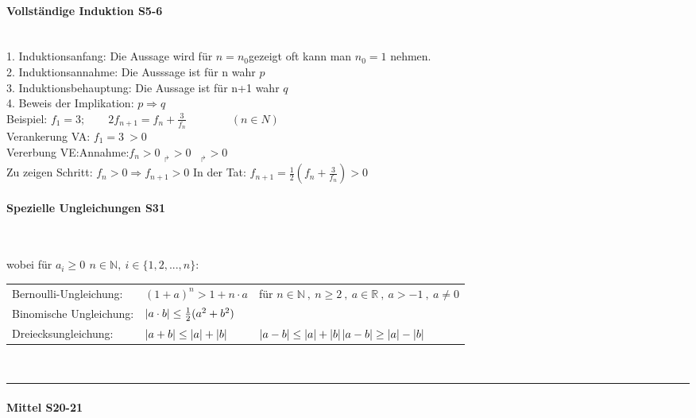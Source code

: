 \paragraph{Vollständige Induktion \color{red} S5-6}\
\color{black}
\label{sub:allgemeines}
\\
1. Induktionsanfang: 		Die Aussage wird für $n = n_{0}$gezeigt oft kann man $n_{0}=1$ nehmen.\\
2. Induktionsannahme: 		Die Ausssage ist für n wahr $p$\\
3. Induktionsbehauptung:	Die Aussage ist für n+1 wahr $q$\\
4. Beweis der Implikation: $p \Rightarrow q$\\
Beispiel: $f_{1}=3;\qquad 2f_{n+1}=f_{n}+\frac{3}{f_{n}} \qquad\qquad(n \in N)$\\
Verankerung VA: $f_{1}=3 \ >0$  \\
Vererbung VE:Annahme:$f_{n}>0$  \qquad\quad \qquad\qquad\qquad\qquad\qquad\qquad\qquad\qquad $_{\Rsh} >0 $ \  $_{\Rsh} >0$\\
Zu zeigen Schritt: $f_{n}>0\Rightarrow f_{n+1}>0$	\qquad \qquad In der Tat: $f_{n+1}= \frac{1}{2}\left(f_{n}+\frac{3}{f_{n}}\right) >0$
\paragraph{Spezielle Ungleichungen \color{red} S31}\

wobei für $a_{i} \geq 0\,\ n \in \mathbb N ,\ i \in \{1,2,...,n\} $:\\
\begin{tabulary}{12cm}{LLL}
Bernoulli-Ungleichung: 	&	$ (1+a)^{n} > 1 +n\cdot a $	&	für $ n \in \mathbb N\ ,\ n\geq 2\ ,\ a\in \mathbb R\ ,\ a > -1\ ,\ a\neq 0  $ \\
Binomische Ungleichung:	&	$ \left\vert a\cdot b\right\vert\leq\frac{1}{2}(a^{2}+b^{2}) $ & \\
Dreiecksungleichung:	& 	$ \left\vert a+b\right\vert \leq \left\vert a\right\vert+ \left\vert b\right\vert $	& $ \left\vert a-b\right\vert\leq \left\vert a\right\vert+ \left\vert b\right\vert $\qquad $\left\vert a-b\right\vert\geq \left\vert a\right\vert- \left\vert b\right\vert$\\
\end{tabulary}\\

\hrule
\paragraph{Mittel \color{red} S20-21}\

